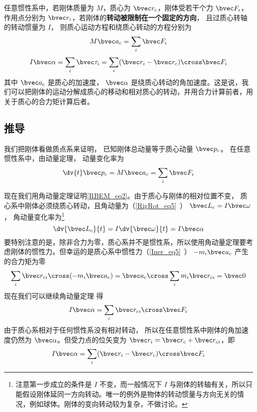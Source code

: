 

任意惯性系中，若刚体质量为 $M$，质心为 $\bvec r_c$，刚体受若干个力 $\bvec F_i$，作用点分别为 $\bvec r_i$，若刚体的\textbf{转动被限制在一个固定的方向}， 且过质心转轴的转动惯量为 $I$， 则质心运动方程和绕质心转动的方程分别为
\begin{equation}\label{RBEM_eq1}
M\bvec a_c = \sum_i \bvec F_i
\end{equation}
\begin{equation}\label{RBEM_eq2}
I \bvec \alpha = \sum_i \bvec \tau_i = \sum_i (\bvec r_i-\bvec r_c) \cross  \bvec F_i
\end{equation}
其中 $\bvec a_c$ 是质心的加速度， $\bvec \alpha$ 是绕质心转动的角加速度。这是说，我们可以把刚体的运动分解成质心的移动和相对质心的转动，并用合力计算前者，用关于质心的合力矩计算后者。

\subsection{推导}
我们把刚体看做质点系来证明， 已知刚体总动量等于质心动量 $\bvec p_c$。 在任意惯性系中，由动量定理， 动量变化率为
\begin{equation}
\dv{t} \bvec p_c = M \bvec a_c = \sum_i \bvec F_i
\end{equation}

现在我们用角动量定理证明\autoref{RBEM_eq2}。由于质心与刚体的相对位置不变，%
质心系中刚体必须绕质心转动，且角动量为（\autoref{RigRot_eq5}~） $\bvec L_c = I \bvec\omega$， 角动量变化率为\footnote{注意第一步成立的条件是 $I$ 不变，而一般情况下 $I$ 与刚体的转轴有关，所以只能假设刚体延同一方向转动。唯一的例外是物体的转动惯量与方向无关的情况，例如球体。刚体的变向转动较为复杂，不做讨论。}
\begin{equation}
\dv{\bvec L_c}{t} = I \dv{\bvec \omega}{t} = I \bvec\alpha
\end{equation}
要特别注意的是，除非合力为零，质心系并不是惯性系，所以使用角动量定理要考虑刚体的惯性力。但幸运的是质心系中惯性力（\autoref{Iner_eq5}~） $-m_i \bvec a_c$ 产生的合力矩为零
\begin{equation}
\sum_i \bvec r_{ci}\cross (-m_i \bvec a_{c}) = \bvec a_{c} \cross \sum_i m_i \bvec r_{ci} = \bvec 0
\end{equation}
现在我们可以继续角动量定理 得
\begin{equation}
I \bvec\alpha = \sum_i \bvec r_{ci} \cross  \bvec F_i
\end{equation}
由于质心系相对于任何惯性系没有相对转动， 所以在任意惯性系中刚体的角加速度仍然为 $\bvec\alpha$。但受力点的位矢变为 $\bvec r_i = \bvec r_c + \bvec r_{ci}$，即
\begin{equation}\label{RBEM_eq7}
I \bvec \alpha = \sum_i (\bvec r_i-\bvec r_c) \cross  \bvec F_i
\end{equation}


